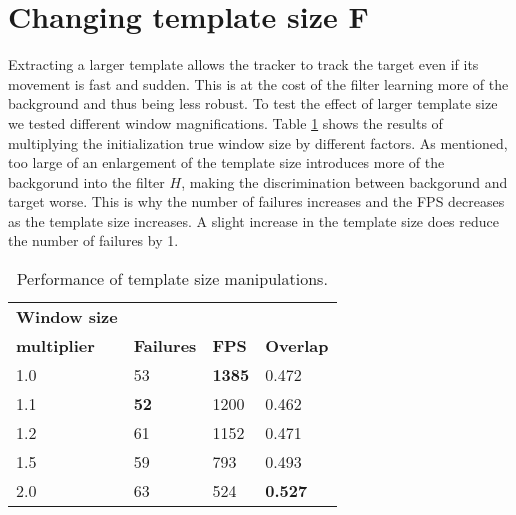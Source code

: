 \documentclass[9pt]{IEEEtran}
\begin{document}
\section{Changing template size F}
Extracting a larger template allows the tracker to track the target even if its movement is fast and sudden.
This is at the cost of the filter learning more of the background and thus being less robust.
To test the effect of larger template size we tested different window magnifications.
Table \ref*{label:window} shows the results of multiplying the initialization true window size by different factors.
As mentioned, too large of an enlargement of the template size introduces more of the backgorund into the filter $H$, making the discrimination between backgorund and target worse.
This is why the number of failures increases and the FPS decreases as the template size increases.
A slight increase in the template size does reduce the number of failures by 1.
\begin{table}[!ht]
    \centering
    \begin{tabular}{llll}
        \textbf{Window size} \\
        \textbf{multiplier} & \textbf{Failures} & \textbf{FPS} & \textbf{Overlap}\\ \hline
        1.0 & 53 & \textbf{1385} & 0.472 \\ 
        1.1 & \textbf{52} & 1200 & 0.462 \\ 
        1.2 & 61 & 1152 & 0.471 \\ 
        1.5 & 59 & 793 & 0.493 \\ 
        2.0 & 63 & 524 & \textbf{0.527} \\ \hline
    \end{tabular}
    \caption{Performance of template size manipulations.}
    \label{label:window}
\end{table}
\end{document}
